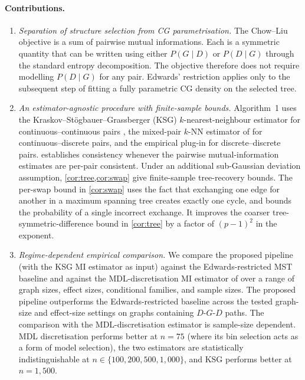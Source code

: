 \paragraph{Contributions.}
\begin{enumerate}
\item \emph{Separation of structure selection from CG
parametrisation.} The Chow--Liu objective is a sum of pairwise mutual
informations. Each is a symmetric quantity that can be written using
either $P(G \mid D)$ or $P(D \mid G)$ through the standard entropy
decomposition. The objective therefore does not require modelling
$P(D \mid G)$ for any pair. Edwards' restriction applies only to
the subsequent step of fitting a fully parametric CG density on
the selected tree.

\item \emph{An estimator-agnostic procedure with finite-sample
bounds.} Algorithm~1 uses the
Kraskov--St\"ogbauer--Grassberger (KSG) $k$-nearest-neighbour estimator
for continuous--continuous pairs \citep{kraskov2004estimating}, the
mixed-pair $k$-NN estimator of \citet{gao2017estimating} for
continuous--discrete pairs, and the empirical plug-in for
discrete--discrete pairs.  establishes consistency
whenever the pairwise mutual-information estimates are per-pair
consistent. Under an additional sub-Gaussian deviation assumption,
\cref{cor:tree,cor:swap} give finite-sample tree-recovery bounds.
The per-swap bound in \cref{cor:swap} uses the fact that exchanging
one edge for another in a maximum spanning tree creates exactly one
cycle, and bounds the probability of a single incorrect exchange. It
improves the coarser tree-symmetric-difference bound in
\cref{cor:tree} by a factor of $(p-1)^2$ in the exponent.

\item \emph{Regime-dependent empirical comparison.} We compare
the proposed pipeline (with the KSG MI estimator as input)
against the Edwards-restricted MST baseline and against the
MDL-discretisation MI estimator of \citet{suzuki2017chow} over a
range of graph sizes, effect sizes, conditional families, and
sample sizes. The proposed pipeline outperforms the Edwards-restricted
baseline across the tested graph-size and effect-size settings on
graphs containing $D$-$G$-$D$ paths. The comparison with the
MDL-discretisation estimator is sample-size dependent. MDL
discretisation performs better at $n = 75$ (where its bin selection
acts as a form of model selection), the two estimators are
statistically indistinguishable at $n \in \{100, 200, 500, 1{,}000\}$,
and KSG performs better at $n = 1{,}500$.
\end{enumerate}

